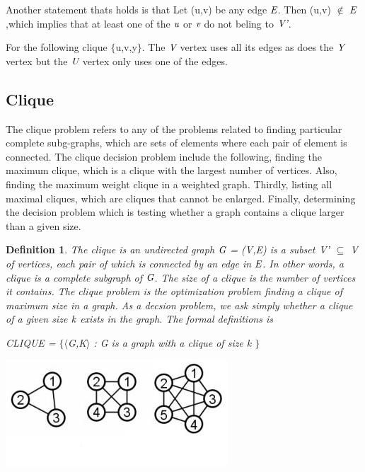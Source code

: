 \documentclass[a4paper]{report}
\newtheorem{defi}{Definition}
\begin{document}
\vspace{3mm}
Another statement thats holds is that Let (u,v) be any edge $\emph{E}$. Then (u,v) $\not\in$ $\emph{E}$,which implies that at least one of the $\emph{u}$ or $\emph{v}$ do not beling to $\emph{V'}$.

\vspace{3mm}
For the following clique $\lbrace$u,v,y$\rbrace$. The $\emph{V}$ vertex uses all its edges as does the $\emph{Y}$ vertex but the $\emph{U}$ vertex only uses one of the edges.



\subsection{Clique}
The clique problem refers to any of the problems related to finding particular complete subg-graphs, which are sets of elements where each pair of element is connected. The clique decision problem include the following, finding the maximum clique, which is a clique with the largest number of vertices. Also, finding the maximum weight clique in a weighted graph. Thirdly, listing all maximal cliques, which are cliques that cannot be enlarged. Finally, determining the decision problem which is testing whether a graph contains a clique larger than a given size.

\begin{defi}
The clique is an undirected graph $\emph{G}$ = (V,E) is a subset $\emph{V'}$ $\subseteq$ $\emph{V}$ of vertices, each pair of which is connected by an edge in $\emph{E}$. In other words, a clique is a complete subgraph of $\emph{G}$. The size of a clique is the number of vertices it contains. The clique problem is the optimization problem finding a clique of maximum size in a graph. As a decsion problem, we ask simply whether a clique of a given size $\emph{k}$ exists in the graph. The formal definitions is 

CLIQUE = $\lbrace$$\langle$G,K$\rangle$ : G is a graph with a clique of size k $\rbrace$
\end{defi}

\begin{center}
\includegraphics[scale=0.80]{clique.png}
\end{center}
\end{document}
